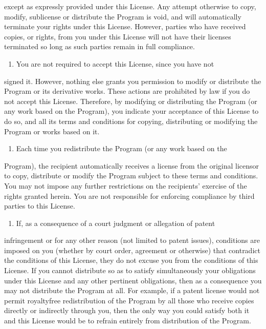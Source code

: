 \documentclass[letterpaper,10pt,english]{sphinxmanual}
\begin{document}
except as expressly provided under this License.  Any attempt
otherwise to copy, modify, sublicense or distribute the Program is
void, and will automatically terminate your rights under this License.
However, parties who have received copies, or rights, from you under
this License will not have their licenses terminated so long as such
parties remain in full compliance.
\begin{enumerate}
%
\setcounter{enumi}{4}
\item {} 
You are not required to accept this License, since you have not

\end{enumerate}

signed it.  However, nothing else grants you permission to modify or
distribute the Program or its derivative works.  These actions are
prohibited by law if you do not accept this License.  Therefore, by
modifying or distributing the Program (or any work based on the
Program), you indicate your acceptance of this License to do so, and
all its terms and conditions for copying, distributing or modifying
the Program or works based on it.
\begin{enumerate}
%
\setcounter{enumi}{5}
\item {} 
Each time you redistribute the Program (or any work based on the

\end{enumerate}

Program), the recipient automatically receives a license from the
original licensor to copy, distribute or modify the Program subject to
these terms and conditions.  You may not impose any further
restrictions on the recipients’ exercise of the rights granted herein.
You are not responsible for enforcing compliance by third parties to
this License.
\begin{enumerate}
%
\setcounter{enumi}{6}
\item {} 
If, as a consequence of a court judgment or allegation of patent

\end{enumerate}

infringement or for any other reason (not limited to patent issues),
conditions are imposed on you (whether by court order, agreement or
otherwise) that contradict the conditions of this License, they do not
excuse you from the conditions of this License.  If you cannot
distribute so as to satisfy simultaneously your obligations under this
License and any other pertinent obligations, then as a consequence you
may not distribute the Program at all.  For example, if a patent
license would not permit royalty\sphinxhyphen{}free redistribution of the Program by
all those who receive copies directly or indirectly through you, then
the only way you could satisfy both it and this License would be to
refrain entirely from distribution of the Program.
\end{document}
